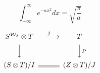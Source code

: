 \documentclass[10pt]{book}
\begin{document}
\begin{mdSnippets}
\begin{mdInlineSnippet}%
\end{mdInlineSnippet}
\begin{mdDisplaySnippet}[e6b9d584fb0c9adbfec95f21f0a198f3]%
\begin{mdDiv}[class={math,math-display},color={},math-needpdf={}]%
\[%
 \int_{-\infty}^\infty e^{-a x^2} d x = \sqrt{\frac{\pi}{a}}\]%
\end{mdDiv}%

\end{mdDisplaySnippet}
\begin{mdDisplaySnippet}[8e0dd4b39ca7a6e08378a6bdf2689841]%
\begin{mdDiv}[class={math,math-display},color={},math-needpdf={}]%
\[%
\begin{CD}
S^{{\mathcal{W}}_\Lambda}\otimes T @>j>> T\\
@VVV @VV{P}V\\
(S\otimes T)/I @= (Z\otimes T)/J
\end{CD}\]%
\end{mdDiv}%


\end{mdDisplaySnippet}
\end{mdSnippets}
\end{document}
